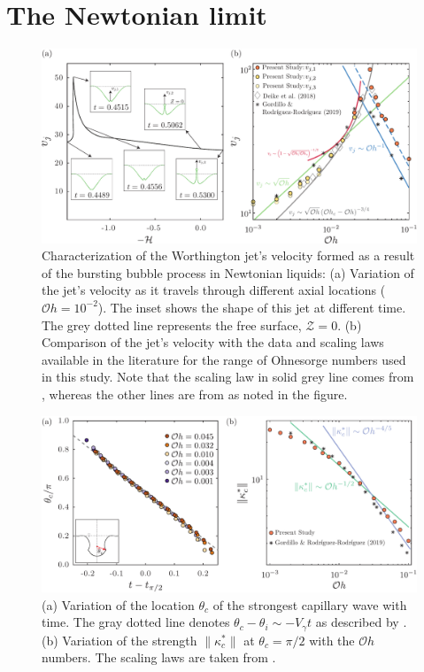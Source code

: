 \documentclass[final]{jfm}
\begin{document}
\section{The Newtonian limit}\label{App::Validation}
\begin{figure}
	\centerline{\includegraphics[width=\linewidth]{FigureC1-eps-converted-to.pdf}}%
	\caption{Characterization of the Worthington jet's velocity formed as a result of the bursting bubble process in Newtonian liquids: (a) Variation of the jet's velocity as it travels through different axial locations ($\mathcal{O}h = 10^{-2}$). The inset shows the shape of this jet at different time. The grey dotted line represents the free surface, $\mathcal{Z} = 0$. (b) Comparison of the jet's velocity with the data and scaling laws available in the literature for the range of Ohnesorge numbers used in this study. Note that the scaling law in solid grey line comes from \citet{deike2018dynamics}, whereas the other lines are from \citet{gordillo2019capillary} as noted in the figure. }
	\label{fig:NewtonianJetVelocity}
\end{figure}
\begin{figure}
	\centerline{\includegraphics[width=\linewidth]{FigureC2-eps-converted-to.pdf}}%
	\caption{(a) Variation of the location $\theta_c$ of the strongest capillary wave with time. The gray dotted line denotes $\theta_c - \theta_i \sim -V_\gamma t$ as described by \citet{gordillo2019capillary}. (b) Variation of the strength $\|\kappa_c^*\|$ at $\theta_c = \pi/2$ with the $\mathcal{O}h$ numbers. The scaling laws are taken from \cite{gordillo2019capillary}.}
	\label{fig:CapillaryWavesComparision}
\end{figure}
\end{document}
